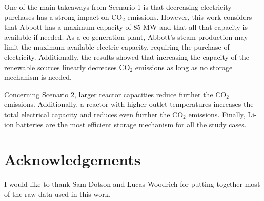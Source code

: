 \documentclass{anstrans}
\begin{document}
One of the main takeaways from Scenario 1 is that decreasing electricity purchases has a strong impact on CO$_2$ emissions.
However, this work considers that Abbott has a maximum capacity of 85 MW and that all that capacity is available if needed. As a co-generation plant, Abbott’s steam production may limit the maximum available electric capacity, requiring the purchase of electricity.
Additionally, the results showed that increasing the capacity of the renewable sources linearly decreases CO$_2$ emissions as long as no storage mechanism is needed.

Concerning Scenario 2, larger reactor capacities reduce further the CO$_2$ emissions.
Additionally, a reactor with higher outlet temperatures increases the total electrical capacity and reduces even further the CO$_2$ emissions.
Finally, Li-ion batteries are the most efficient storage mechanism for all the study cases.


\section{Acknowledgements}

I would like to thank Sam Dotson and Lucas Woodrich for putting together most of the raw data used in this work.




\end{document}
